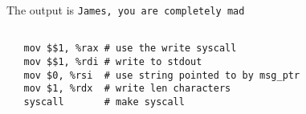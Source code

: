\documentclass[letterpaper]{article}
\begin{document}
  \subsection{}
  The output is \texttt{James, you are completely mad}

  \subsection{}
  \begin{verbatim}
   mov $$1, %rax # use the write syscall
   mov $$1, %rdi # write to stdout
   mov $0, %rsi  # use string pointed to by msg_ptr
   mov $1, %rdx  # write len characters
   syscall       # make syscall
  \end{verbatim}
\end{document}
